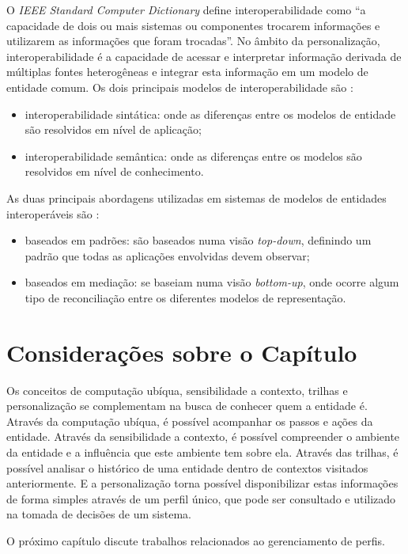 O {\em IEEE Standard Computer Dictionary} \cite{ieeedict} define interoperabilidade como ``a capacidade de dois ou mais sistemas ou componentes trocarem informações e utilizarem as informações que foram trocadas''. No âmbito da personalização, interoperabilidade é a capacidade de acessar e interpretar informação derivada de múltiplas fontes heterogêneas e integrar esta informação em um modelo de entidade comum. Os dois principais modelos de interoperabilidade são \cite{carmagnola09}: 

\begin{itemize}

  \item interoperabilidade sintática: onde as diferenças entre os modelos de entidade são resolvidos em nível de aplicação;
  \item interoperabilidade semântica: onde as diferenças entre os modelos são resolvidos em nível de conhecimento.

\end{itemize}

As duas principais abordagens utilizadas em sistemas de modelos de entidades interoperáveis são \cite{viviani10}:

\begin{itemize}

  \item baseados em padrões: são baseados numa visão {\em top-down}, definindo um padrão que todas as aplicações envolvidas devem observar;
  \item baseados em mediação: se baseiam numa visão {\em bottom-up}, onde ocorre algum tipo de reconciliação entre os diferentes modelos de representação.

\end{itemize}


\section{Considerações sobre o Capítulo}

Os conceitos de computação ubíqua, sensibilidade a contexto, trilhas e personalização se complementam na busca de conhecer quem a entidade é. Através da computação ubíqua, é possível acompanhar os passos e ações da entidade. Através da sensibilidade a contexto, é possível compreender o ambiente da entidade e a influência que este ambiente tem sobre ela. Através das trilhas, é possível analisar o histórico de uma entidade dentro de contextos visitados anteriormente. E a personalização torna possível disponibilizar estas informações de forma simples através de um perfil único, que pode ser consultado e utilizado na tomada de decisões de um sistema.

O próximo capítulo discute trabalhos relacionados ao gerenciamento de perfis.
